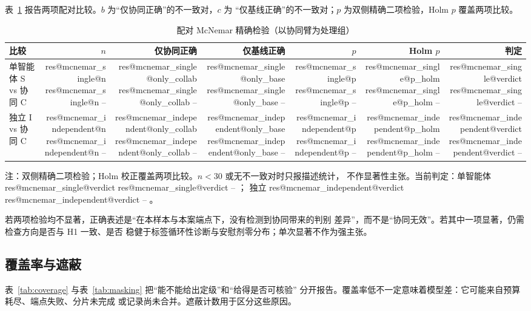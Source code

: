 \documentclass[UTF8,fontset=fandol,11pt,a4paper]{ctexart}
\makeatletter
\newcommand{\RESULT}[2]{%
  \ifcsname res@#1@#2\endcsname
    \csname res@#1@#2\endcsname
  \else
    --%
  \fi}
\makeatother
\begin{document}
表~\ref{tab:mcnemar} 报告两项配对比较。$b$ 为“仅协同正确”的不一致对，$c$ 为
“仅基线正确”的不一致对；$p$ 为双侧精确二项检验，Holm $p$ 覆盖两项比较。

\begin{table}[t]
\centering
\caption{配对 McNemar 精确检验（以协同臂为处理组）}
\label{tab:mcnemar}
\footnotesize
\setlength{\tabcolsep}{4pt}
\begin{tabular}{lrrrrrr}
\toprule
比较 & $n$ & 仅协同正确 & 仅基线正确 & $p$ & Holm $p$ & 判定 \\
\midrule
单智能体 S vs 协同 C & \RESULT{mcnemar_single}{n} &
\RESULT{mcnemar_single}{only_collab} & \RESULT{mcnemar_single}{only_base} &
\RESULT{mcnemar_single}{p} & \RESULT{mcnemar_single}{p_holm} &
\RESULT{mcnemar_single}{verdict} \\
独立 I vs 协同 C & \RESULT{mcnemar_independent}{n} &
\RESULT{mcnemar_independent}{only_collab} & \RESULT{mcnemar_independent}{only_base} &
\RESULT{mcnemar_independent}{p} & \RESULT{mcnemar_independent}{p_holm} &
\RESULT{mcnemar_independent}{verdict} \\
\bottomrule
\end{tabular}
\par\smallskip
\raggedright\scriptsize
注：双侧精确二项检验；Holm 校正覆盖两项比较。$n<30$ 或无不一致对时只报描述统计，
不作显著性主张。当前判定：单智能体 \RESULT{mcnemar_single}{verdict}；
独立 \RESULT{mcnemar_independent}{verdict}。
\end{table}

若两项检验均不显著，正确表述是“在本样本与本案端点下，没有检测到协同带来的判别
差异”，而不是“协同无效”。若其中一项显著，仍需检查方向是否与 H1 一致、是否
稳健于标签循环性诊断与安慰剂零分布；单次显著不作为强主张。

\subsection{覆盖率与遮蔽}

表~\ref{tab:coverage} 与表~\ref{tab:masking} 把“能不能给出定级”和“给得是否可核验”
分开报告。覆盖率低不一定意味着模型差：它可能来自预算耗尽、端点失败、分片未完成
或记录尚未合并。遮蔽计数用于区分这些原因。
\end{document}
